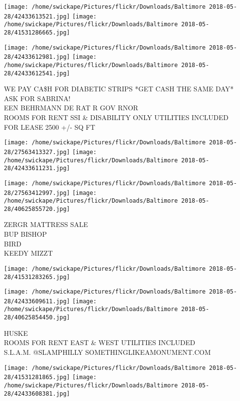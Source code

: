 \documentclass[10pt,letterpaper]{article}
\begin{document}
\texttt{[image: /home/swickape/Pictures/flickr/Downloads/Baltimore 2018-05-28/42433613521.jpg]}
\texttt{[image: /home/swickape/Pictures/flickr/Downloads/Baltimore 2018-05-28/41531286665.jpg]}

\texttt{[image: /home/swickape/Pictures/flickr/Downloads/Baltimore 2018-05-28/42433612981.jpg]}
\texttt{[image: /home/swickape/Pictures/flickr/Downloads/Baltimore 2018-05-28/42433612541.jpg]}

WE PAY CA\$H FOR DIABETIC STRIPS *GET CASH THE SAME DAY* ASK FOR SABRINA!\\
EEN BEHRMANN DE RAT R GOV RNOR\\
ROOMS FOR RENT SSI \& DISABILITY ONLY UTILITIES INCLUDED\\
FOR LEASE 2500 +/{-} SQ FT\\
\pagebreak

\texttt{[image: /home/swickape/Pictures/flickr/Downloads/Baltimore 2018-05-28/27563413327.jpg]}
\texttt{[image: /home/swickape/Pictures/flickr/Downloads/Baltimore 2018-05-28/42433611231.jpg]}

\texttt{[image: /home/swickape/Pictures/flickr/Downloads/Baltimore 2018-05-28/27563412997.jpg]}
\texttt{[image: /home/swickape/Pictures/flickr/Downloads/Baltimore 2018-05-28/40625855720.jpg]}

ZERGR MATTRESS SALE\\
BUP BISHOP\\
BIRD\\
KEEDY MIZZT\\
\pagebreak

\texttt{[image: /home/swickape/Pictures/flickr/Downloads/Baltimore 2018-05-28/41531283265.jpg]}

\vspace{0.25in}
\texttt{[image: /home/swickape/Pictures/flickr/Downloads/Baltimore 2018-05-28/42433609611.jpg]}
\texttt{[image: /home/swickape/Pictures/flickr/Downloads/Baltimore 2018-05-28/40625854450.jpg]}

HUSKE\\
ROOMS FOR RENT EAST \& WEST UTILITIES INCLUDED\\
S.L.A.M. @SLAMPHILLY SOMETHINGLIKEAMONUMENT.COM\\
\pagebreak

\texttt{[image: /home/swickape/Pictures/flickr/Downloads/Baltimore 2018-05-28/41531281865.jpg]}
\texttt{[image: /home/swickape/Pictures/flickr/Downloads/Baltimore 2018-05-28/42433608381.jpg]}
\end{document}
